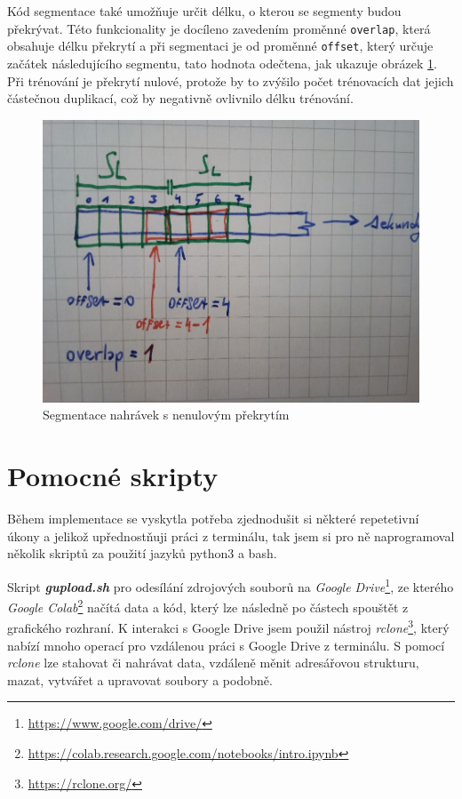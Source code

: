 Kód segmentace také umožňuje určit délku, o kterou se segmenty budou překrývat. Této funkcionality je docíleno zavedením proměnné \texttt{overlap}, která obsahuje délku překrytí a při segmentaci je od proměnné \texttt{offset}, který určuje začátek následujícího segmentu, tato hodnota odečtena, jak ukazuje obrázek \ref{fig:segment_overlap}. Při trénování je překrytí nulové, protože by to zvýšilo počet trénovacích dat jejich částečnou duplikací, což by negativně ovlivnilo délku trénování.

\begin{figure}[H]
    \centering
    \includegraphics[scale=0.25]{obrazky-figures/segment_overlap.jpg}
    \caption{\label{fig:segment_overlap}Segmentace nahrávek s nenulovým překrytím}
\end{figure}


\section{Pomocné skripty}
Během implementace se vyskytla potřeba zjednodušit si některé repetetivní úkony a jelikož upřednostňuji práci z terminálu, tak jsem si pro ně naprogramoval několik skriptů za použití jazyků python3 a bash. 

Skript \textbf{\textit{gupload.sh}} pro odesílání zdrojových souborů na \textit{Google Drive}\footnote{\url{https://www.google.com/drive/}}, ze kterého \textit{Google Colab}\footnote{\url{https://colab.research.google.com/notebooks/intro.ipynb}} načítá data a kód, který lze následně po částech spouštět z grafického rozhraní. K interakci s Google Drive jsem použil nástroj \textit{rclone}\footnote{\url{https://rclone.org/}}, který nabízí mnoho operací pro vzdálenou práci s Google Drive z terminálu. S pomocí \textit{rclone} lze stahovat či nahrávat data, vzdáleně měnit adresářovou strukturu, mazat, vytvářet a upravovat soubory a podobně. 

